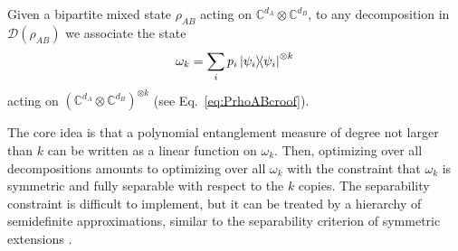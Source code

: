 \documentclass[11pt,a4paper]{report}
\newcommand{\C}{\mathds{C}}
\newcounter{reptag}
\newif\iftags \tagsfalse   %
\newcommand{\reptagbox}[3]{\iftags\par\smallskip\noindent\refstepcounter{reptag}%
  \fcolorbox{#1}{#1!7}{\parbox{\dimexpr\linewidth-2\fboxsep-2\fboxrule\relax}{\small
  \textcolor{#1}{\textbf{[\thereptag]\ #2.}}\ #3}}\par\smallskip\fi}
\newcommand{\detail}[1]{\reptagbox{tagD}{More detail}{#1}}
\begin{document}
Given a bipartite mixed state $\rho_{AB}$ acting on $\C^{d_A} \otimes \C^{d_B}$, to any decomposition in $\mathcal{D}(\rho_{AB})$ we associate the state
\begin{equation}\label{eq:omega}
    \omega_k = \sum_i p_i \dyad{\psi_i}^{\otimes k}
\end{equation}
acting on $(\C^{d_A} \otimes \C^{d_B})^{\otimes k}$ (see Eq.~\eqref{eq:PrhoABcroof}).

The core idea is that a polynomial entanglement measure of degree not larger than $k$ can be written as a linear function on $\omega_k$. Then, optimizing over all decompositions amounts to optimizing over all $\omega_k$ with
the constraint that $\omega_k$ is symmetric and fully separable with respect to the $k$ copies. The separability constraint is difficult to implement, but it can be treated by a hierarchy of semidefinite approximations, similar to the separability criterion of symmetric extensions
\cite{doherty2002}.
\detail{Add a short background on semidefinite programming (primal and dual forms, strong duality, what ``up to solver precision'' means for a certificate), and present the DPS hierarchy of symmetric extensions~\cite{doherty2002} as the template and Ref.~\cite{Toth2015CroofTP} as the starting point: what it did (linear entropy, Schmidt number, three-tangle) and what is new here. Half a page is enough; a longer SDP primer can go in an appendix.}
\end{document}
